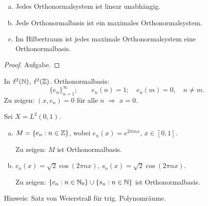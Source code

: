 \begin{thm}
  \begin{enumerate}[a)]
  \item Jedes Orthonormalsystem ist linear unabhängig.
  \item Jede Orthonormalbasis ist ein maximales Orthonormalsystem.
  \item Im Hilbertraum ist jedes maximale Orthonormalsystem eine
    Orthonormalbasis.
  \end{enumerate}
\end{thm}

\begin{proof}
  Aufgabe.
\end{proof}

\begin{exmp}
  In $\ell^2(\mathbb{N})$, $\ell^2(\mathbb{Z})$. Orthonormalbasis:
  \[ \{ e_n \}_{n=1}^\infty; \qquad e_n(n) = 1; \quad e_n(m) = 0, \quad n \ne
    m. \]
  Zu zeigen: $(x,e_n) = 0$ für alle $n$ $\Rightarrow$ $x = 0$.
\end{exmp}

\begin{aufg}
  Sei $X = L^2(0,1)$.
  \begin{enumerate}[a)]
  \item $M = \{e_n : n \in \mathbb{Z} \}$, wobei $e_n(x) = e^{2 \pi i n x}$, $x
    \in [0,1]$.

    Zu zeigen: $M$ ist Orthonormalbasis.
  \item $c_n(x) = \sqrt{2} \cos (2 \pi n x)$, $s_n(x) = \sqrt{2} \cos (2 \pi n
    x)$.

    Zu zeigen: $\{ c_n : n \in \mathbb{N}_0 \} \cup \{ s_n : n \in \mathbb{N} \}$ ist
    Orthonormalbasis.
  \end{enumerate}
\end{aufg}

Hinweis: Satz von Weierstraß für trig. Polynomräume.

\clearpage

